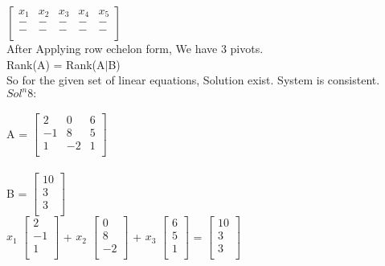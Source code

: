 \documentclass{article}
\begin{document}
$\begin{bmatrix}
    x_1 & x_2 & x_3 & x_4 & x_5\\
    - & - & - & - & - \\
    - & - & - & - & - \\
    \end{bmatrix}$ \\

After Applying row echelon form, We have 3 pivots. \\

Rank(A) = Rank(A$\mid$B)\\

So for the given set of linear equations, Solution exist. System is consistent. \\

$Sol^n 8:$ \\ \\ 

A = $\begin{bmatrix}
    2 & 0 & 6\\
    -1 & 8 & 5 \\
    1 & -2 & 1 \\
    \end{bmatrix}$ \\ \\
    
B = $\begin{bmatrix}
    10\\
    3 \\
    3 \\
    \end{bmatrix}$ \\
    
$x_1$ $\begin{bmatrix}
    2 \\
    -1 \\
    1 \\
    \end{bmatrix}$ + $x_2$ $\begin{bmatrix}
    0\\
    8 \\
    -2 \\
    \end{bmatrix}$ + $x_3$ $\begin{bmatrix}
    6\\
    5 \\
    1 \\
    \end{bmatrix}$ = $\begin{bmatrix}
    10\\
    3 \\
    3 \\
    \end{bmatrix}$ \\
    
\end{document}
